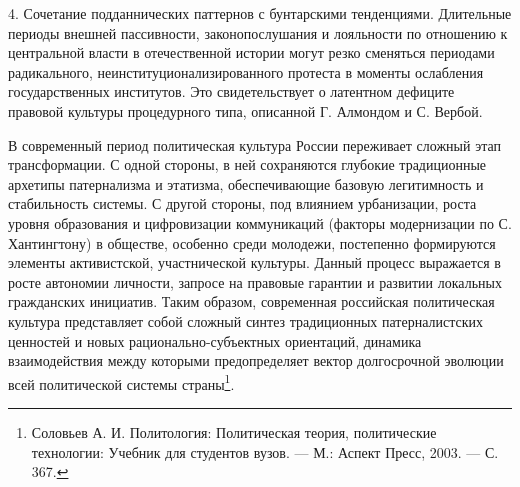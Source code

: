 4. Сочетание подданнических паттернов с бунтарскими тенденциями. Длительные периоды внешней пассивности, законопослушания и лояльности по отношению к центральной власти в отечественной истории могут резко сменяться периодами радикального, неинституционализированного протеста в моменты ослабления государственных институтов. Это свидетельствует о латентном дефиците правовой культуры процедурного типа, описанной Г. Алмондом и С. Вербой.

В современный период политическая культура России переживает сложный этап трансформации. С одной стороны, в ней сохраняются глубокие традиционные архетипы патернализма и этатизма, обеспечивающие базовую легитимность и стабильность системы. С другой стороны, под влиянием урбанизации, роста уровня образования и цифровизации коммуникаций (факторы модернизации по С. Хантингтону) в обществе, особенно среди молодежи, постепенно формируются элементы активистской, участнической культуры. Данный процесс выражается в росте автономии личности, запросе на правовые гарантии и развитии локальных гражданских инициатив. Таким образом, современная российская политическая культура представляет собой сложный синтез традиционных патерналистских ценностей и новых рационально-субъектных ориентаций, динамика взаимодействия между которыми предопределяет вектор долгосрочной эволюции всей политической системы страны\footnote{Соловьев А. И. Политология: Политическая теория, политические технологии: Учебник для студентов вузов. --- М.: Аспект Пресс, 2003. --- С. 367.}.